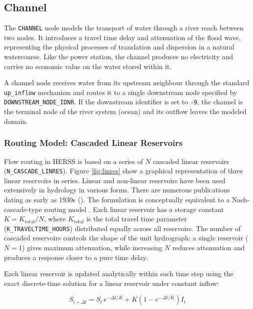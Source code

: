 \documentclass[a4paper, 12pt]{report}
\begin{document}
	\subsection{Channel}
	\label{subsec:channel}

	The \texttt{CHANNEL} node models the transport of water through a river reach between two
	nodes. It introduces a travel time delay and attenuation of the flood wave, representing the
	physical processes of translation and dispersion in a natural watercourse. Like the power
	station, the channel produces no electricity and carries no economic value on the water
	stored within it.

	A channel node receives water from its upstream neighbour through the standard
	\texttt{up\_inflow} mechanism and routes it to a single downstream node specified by
	\texttt{DOWNSTREAM\_NODE\_IDNR}. If the downstream identifier is set to \texttt{-9}, the
	channel is the terminal node of the river system (ocean) and its outflow leaves the modeled domain.

	\subsubsection{Routing Model: Cascaded Linear Reservoirs}
	Flow routing in HERSS is based on a series of $N$ cascaded linear reservoirs
	(\texttt{N\_CASCADE\_LINRES}). Figure \ref{fig:linres} show a graphical representation of 
	three linear reservoirs in series. Linear and non-linear reservoirs have been used extensively
	in hydrology in various forms. There are numerous publications dating as early as 1930s (\cite{Zoch1934, maccarthy1938, Nash1957, Dooge1959, chow88, maidment1993, MATEO2015}). The formulation is conceptually equivalent to a Nash-cascade-type routing model \cite{Nash1957}. 
	Each linear reservoir has a storage constant
	$K = K_\mathrm{total} / N$, where $K_\mathrm{total}$ is the total travel time parameter
	(\texttt{K\_TRAVELTIME\_HOURS}) distributed equally across all reservoirs. The number of
	cascaded reservoirs controls the shape of the unit hydrograph: a single reservoir ($N = 1$)
	gives maximum attenuation, while increasing $N$ reduces attenuation and produces a response
	closer to a pure time delay.

	Each linear reservoir is updated analytically within each time step using the exact
	discrete-time solution for a linear reservoir under constant inflow:

	\[
	S_{t+\Delta t} = S_t \, e^{-\Delta t / K} + K \left(1 - e^{-\Delta t / K}\right) I_t
	\]
\end{document}
